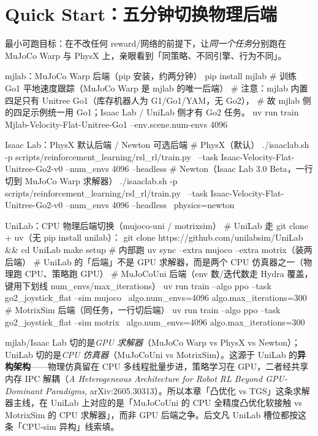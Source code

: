 \section*{Quick Start：五分钟切换物理后端}
\label{sec:rlmc-phys-quickstart}

最小可跑目标：在不改任何 reward/网络的前提下，让\emph{同一个任务}分别跑在 MuJoCo Warp 与 PhysX 上，亲眼看到「同策略、不同引擎、行为不同」。

\begin{codebox}[bash]{mjlab：MuJoCo Warp 后端（pip 安装，约两分钟）}
pip install mjlab
# 训练 Go1 平地速度跟踪（MuJoCo Warp 是 mjlab 的唯一后端）
# 注意：mjlab 内置四足只有 Unitree Go1（库存机器人为 G1/Go1/YAM，无 Go2），
#       故 mjlab 侧的四足示例统一用 Go1；Isaac Lab / UniLab 侧才有 Go2 任务。
uv run train Mjlab-Velocity-Flat-Unitree-Go1 --env.scene.num-envs 4096
\end{codebox}

\begin{codebox}[bash]{Isaac Lab：PhysX 默认后端 / Newton 可选后端}
# PhysX（默认）
./isaaclab.sh -p scripts/reinforcement_learning/rsl_rl/train.py \
    --task Isaac-Velocity-Flat-Unitree-Go2-v0 --num_envs 4096 --headless
# Newton（Isaac Lab 3.0 Beta，一行切到 MuJoCo Warp 求解器）
./isaaclab.sh -p scripts/reinforcement_learning/rsl_rl/train.py \
    --task Isaac-Velocity-Flat-Unitree-Go2-v0 --num_envs 4096 --headless \
    physics=newton
\end{codebox}

\begin{codebox}[bash]{UniLab：CPU 物理后端切换（mujoco-uni / motrixsim）}
# UniLab 走 git clone + uv（无 pip install unilab）：
git clone https://github.com/unilabsim/UniLab && cd UniLab
make setup              # 内部跑 uv sync --extra mujoco --extra motrix（装两后端）
# UniLab 的「后端」不是 GPU 求解器，而是两个 CPU 仿真器之一（物理跑 CPU、策略跑 GPU）
# MuJoCoUni 后端（env 数/迭代数走 Hydra 覆盖，键用下划线 num_envs/max_iterations）
uv run train --algo ppo --task go2_joystick_flat --sim mujoco \
    algo.num_envs=4096 algo.max_iterations=300
# MotrixSim 后端（同任务，一行切后端）
uv run train --algo ppo --task go2_joystick_flat --sim motrix \
    algo.num_envs=4096 algo.max_iterations=300
\end{codebox}

\begin{note}[UniLab 的「后端」与 mjlab/Isaac Lab 不在同一维度]
mjlab/Isaac Lab 切的是\emph{GPU 求解器}（MuJoCo Warp vs PhysX vs Newton）；UniLab 切的是\emph{CPU 仿真器}（MuJoCoUni vs MotrixSim）。这源于 UniLab 的\textbf{异构架构}——物理仿真留在 CPU 多线程批量步进，策略学习在 GPU，二者经共享内存 IPC 解耦（\emph{A Heterogeneous Architecture for Robot RL Beyond GPU-Dominant Paradigms}, arXiv:2605.30313）\cite{unilab2026}。所以本章「凸优化 vs TGS」这条求解器主线，在 UniLab 上对应的是「MuJoCoUni 的 CPU 全精度凸优化软接触 vs MotrixSim 的 CPU 求解器」，而非 GPU 后端之争。后文凡 UniLab 槽位都按这条「CPU-sim 异构」线索填。
\end{note}

